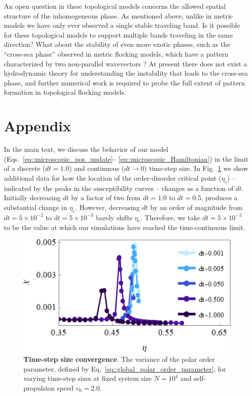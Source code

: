 \documentclass[twoside,twocolumn,9pt]{article}
\begin{document}
An open question in these topological models concerns the allowed spatial structure of the inhomogeneous phase.
As mentioned above, unlike in metric models we have only ever observed a single stable traveling band.
Is it possible for these topological models to support multiple bands traveling in the same direction? What about the stability of even more exotic phases, such as the ``cross-sea phase'' observed in metric flocking models, which have a pattern characterized by two non-parallel wavevectors \cite{kursten2020dry}?
At present there does not exist a hydrodynamic theory for understanding the instability that leads to the cross-sea phase, and further numerical work is required to probe the full extent of pattern formation in topological flocking models.

\section{Appendix}

In the main text, we discuss the behavior of our model (Eqs.~\ref{eq::microscopic_pos_update}-~\ref{eq::microscopic_Hamiltonian}) in the limit of a discrete ($dt=1.0$) and continuous ($dt\rightarrow0$) time-step size. In Fig.~\ref{fig:TimestepSizeConvergence} we show additional data for how the location of the order-disorder critical point ($\eta_c$) -- indicated by the peaks in the susceptibility curves -- changes as a function of $dt$. Initially decreasing $dt$ by a factor of two from $dt=1.0$ to $dt=0.5$, produces a substantial change in $\eta_c$. However, decreasing $dt$ by an order of magnitude from $dt=5\times10^{-2}$ to $dt=5\times10^{-3}$ barely shifts $\eta_c$. Therefore, we take $dt=5\times10^{-3}$ to be the value at which our simulations have reached the time-continuous limit.

\begin{figure}[h]
	\centering
	\includegraphics[width=0.99\columnwidth]{Figures/timestep_convergence.png}
    \caption{\textbf{Time-step size convergence}. The variance of the polar order parameter, defined by Eq.~\ref{eq::global_polar_order_parameter}, for varying time-step sizes at fixed system size $N=10^4$ and self-propulsion speed $v_0=2.0$.
	}
	\label{fig:TimestepSizeConvergence}
\end{figure}
\end{document}
